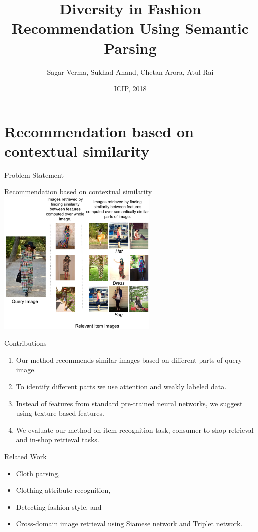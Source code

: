 \documentclass[handout]{beamer}
\title[EVA, Ann Arbor, MI 2015 \insertdate]{Diversity in Fashion Recommendation Using Semantic Parsing}
\author{Sagar Verma\inst{1}, Sukhad Anand\inst{1}, Chetan Arora\inst{1}, Atul Rai\inst{2}}
\institute[IIIT Delhi and Staqu Technologies] %
{
  \inst{1}%
  Department of Computer Science and Engineering\\
  Indraprastha Institute of Information Technology, Delhi.
  \and
  \inst{2}%
  Staqu Technologies}
\date{ICIP, 2018}
\begin{document}
\begin{frame}
\titlepage
\end{frame}

\section{Recommendation based on contextual similarity}

\begin{frame}{Problem Statement}
\begin{center}
{\Large Recommendation based on contextual similarity}\\
\vspace{.5cm}
\includegraphics[width=0.8\linewidth, height=7cm]{images/teaser_staqu_texture}
\end{center}
\end{frame}


\begin{frame}{Contributions}
  \begin{enumerate}
    \item Our method recommends similar images based on different parts of query image.

    \item To identify different parts we use attention and weakly labeled data.

    \item Instead of features from standard pre-trained neural networks, we suggest using texture-based features.

    \item We evaluate our method on item recognition task, consumer-to-shop retrieval and in-shop retrieval tasks.
  \end{enumerate}
\end{frame}

\begin{frame}{Related Work}
  \begin{itemize}
    \item Cloth parsing,
    \item Clothing attribute recognition,
    \item Detecting fashion style, and
    \item Cross-domain image retrieval using Siamese network and Triplet network.
  \end{itemize}
\end{frame}
\end{document}
